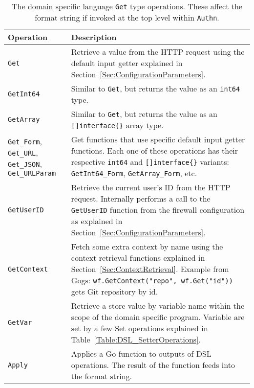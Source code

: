 \begin{table}[h]
\centering

\begin{tabular}{ m{2.5cm} m{11.5cm}  } 
 \hline
 Operation & Description \\ 
 \hline \hline

 \lstinline|Get| & Retrieve a value from the HTTP request using the default input getter explained in Section~\ref{Sec:ConfigurationParameters}. \\ \hline

 \lstinline|GetInt64| & Similar to \lstinline|Get|, but returns the value as an \lstinline|int64| type. \\ \hline

 \lstinline|GetArray| & Similar to \lstinline|Get|, but returns the value as an \lstinline|[]interface{}| array type. \\ \hline

 \lstinline|Get_Form|, \lstinline|Get_URL|, \lstinline|Get_JSON|, \lstinline|Get_URLParam| & Get functions that use specific default input getter functions. Each one of these operations has their respective \lstinline|int64| and \lstinline|[]interface{}| variants: \lstinline|GetInt64_Form|, \lstinline|GetArray_Form|, etc. \\ \hline

 \lstinline|GetUserID| & Retrieve the current user's ID from the HTTP request. Internally performs a call to the \lstinline|GetUserID| function from the firewall configuration as explained in Section~\ref{Sec:ConfigurationParameters}. \\ \hline

 \lstinline|GetContext| & Fetch some extra context by name using the context retrieval functions explained in Section~\ref{Sec:ContextRetrieval}. \newline Example from Gogs: \lstinline|wf.GetContext("repo", wf.Get("id"))| gets Git repository by id. \\ \hline

 \lstinline|GetVar| & Retrieve a store value by variable name within the scope of the domain specific program. Variable are set by a few Set operations explained in Table~\ref{Table:DSL_SetterOperations}. \\ \hline

 \lstinline|Apply| & Applies a Go function to outputs of DSL operations. The result of the function feeds into the format string. \\ \hline

\end{tabular}
\caption{The domain specific language \lstinline{Get} type operations. These affect the format string if invoked at the top level within \lstinline|Authn|.}
\label{Table:DSL_GetterOperations}
\end{table}

